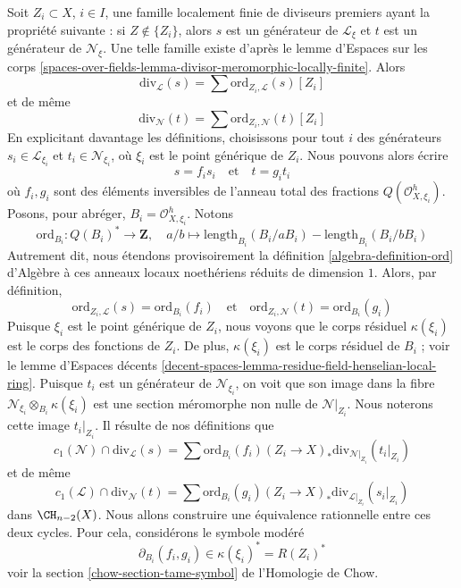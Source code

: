\medskip\noindent
Soit $Z_i \subset X$, $i \in I$, une famille localement finie de diviseurs
premiers ayant la propriété suivante : si $Z \not \in \{Z_i\}$, alors $s$ est
un générateur de $\mathcal{L}_\xi$ et $t$ est un générateur de
$\mathcal{N}_\xi$. Une telle famille existe d'après le lemme d'Espaces sur les corps
\ref{spaces-over-fields-lemma-divisor-meromorphic-locally-finite}. Alors
$$
\text{div}_\mathcal{L}(s) = \sum \text{ord}_{Z_i, \mathcal{L}}(s) [Z_i]
$$
et de même
$$
\text{div}_\mathcal{N}(t) = \sum \text{ord}_{Z_i, \mathcal{N}}(t) [Z_i]
$$
En explicitant davantage les définitions, choisissons pour tout $i$ des générateurs
$s_i \in \mathcal{L}_{\xi_i}$ et $t_i \in \mathcal{N}_{\xi_i}$,
où $\xi_i$ est le point générique de $Z_i$. Nous pouvons alors écrire
$$
s = f_i s_i
\quad\text{et}\quad
t = g_i t_i
$$
où $f_i, g_i$ sont des éléments inversibles de l'anneau total des fractions
$Q(\mathcal{O}_{X, \xi_i}^h)$. Posons, pour abréger, $B_i = \mathcal{O}_{X,
\xi_i}^h$. Notons
$$
\text{ord}_{B_i} : Q(B_i)^* \longrightarrow \mathbf{Z},\quad
a/b \longmapsto
\text{length}_{B_i}(B_i/aB_i) - \text{length}_{B_i}(B_i/bB_i)
$$
Autrement dit, nous étendons provisoirement la définition
\ref{algebra-definition-ord} d'Algèbre à ces anneaux locaux noethériens réduits
de dimension $1$. Alors, par définition,
$$
\text{ord}_{Z_i, \mathcal{L}}(s) = \text{ord}_{B_i}(f_i)
\quad\text{et}\quad
\text{ord}_{Z_i, \mathcal{N}}(t) = \text{ord}_{B_i}(g_i)
$$
Puisque $\xi_i$ est le point générique de $Z_i$, nous voyons que le corps
résiduel $\kappa(\xi_i)$ est le corps des fonctions de $Z_i$. De plus,
$\kappa(\xi_i)$ est le corps résiduel de $B_i$ ; voir le lemme d'Espaces décents
\ref{decent-spaces-lemma-residue-field-henselian-local-ring}. Puisque $t_i$
est un générateur de $\mathcal{N}_{\xi_i}$, on voit que son image dans la fibre
$\mathcal{N}_{\xi_i} \otimes_{B_i} \kappa(\xi_i)$ est une section méromorphe
non nulle de $\mathcal{N}|_{Z_i}$. Nous noterons cette image $t_i|_{Z_i}$. Il
résulte de nos définitions que
$$
c_1(\mathcal{N}) \cap \text{div}_\mathcal{L}(s) =
\sum \text{ord}_{B_i}(f_i)
(Z_i \to X)_*\text{div}_{\mathcal{N}|_{Z_i}}(t_i|_{Z_i})
$$
et de même
$$
c_1(\mathcal{L}) \cap \text{div}_\mathcal{N}(t) =
\sum \text{ord}_{B_i}(g_i)
(Z_i \to X)_*\text{div}_{\mathcal{L}|_{Z_i}}(s_i|_{Z_i})
$$
dans $\CH_{n - 2}(X)$. Nous allons construire une équivalence rationnelle entre
ces deux cycles. Pour cela, considérons le symbole modéré
$$
\partial_{B_i}(f_i, g_i) \in \kappa(\xi_i)^* = R(Z_i)^*
$$
voir la section \ref{chow-section-tame-symbol} de l'Homologie de Chow.

